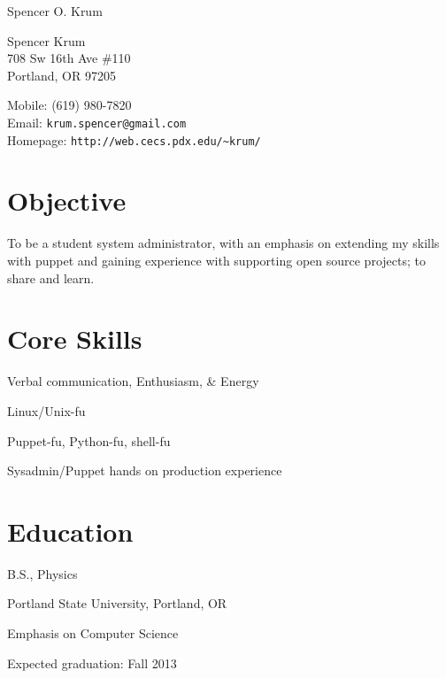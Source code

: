 \documentclass[10pt,letterpaper]{article}
\def\name{Spencer O. Krum}
\renewenvironment{itemize}{
  \begin{list}{}{
    \setlength{\leftmargin}{1.5em}
    \setlength{\itemsep}{0.25em}
    \setlength{\parskip}{0pt}
    \setlength{\parsep}{0.25em}
  }
}{
  \end{list}
}
\begin{document}
{\huge \name}


\vspace{0.25in}

\begin{minipage}[t]{0.5\textwidth}
  Spencer Krum\\
  708 Sw 16th Ave \#110\\
  Portland, OR 97205
\end{minipage}
\begin{minipage}[t]{0.5\textwidth}
  Mobile: (619) 980-7820 \\
  Email: \texttt{krum.spencer@gmail.com} \\
  Homepage: \texttt{http://web.cecs.pdx.edu/\textasciitilde krum/} \\
\end{minipage}

\section*{Objective}

To be a student system administrator, with an emphasis on extending my skills with puppet and gaining experience with supporting open source projects; to share and learn. \\

\begin{minipage}[t]{0.5\textwidth}
\section*{Core Skills}
\begin{itemize}
\item Verbal communication, Enthusiasm, \& Energy
\item Linux/Unix-fu
\item Puppet-fu, Python-fu, shell-fu
\item Sysadmin/Puppet hands on production experience
\end{itemize}
\end{minipage}
\begin{minipage}[t]{0.5\textwidth}
\section*{Education}
\begin{itemize}

  \item B.S., Physics
  \item Portland State University, Portland, OR
  \item Emphasis on Computer Science
  \item Expected graduation: Fall 2013
  
\end{itemize}
\end{minipage}
\end{document}
